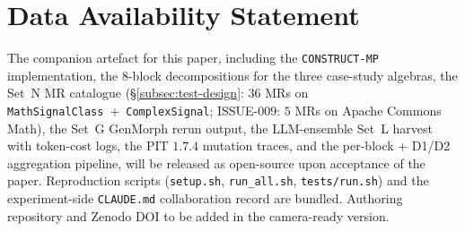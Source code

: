 \documentclass[acmsmall, screen]{acmart}
\begin{document}
\section*{Data Availability Statement}
The companion artefact for this paper, including the
\texttt{CONSTRUCT-MP} implementation, the 8-block decompositions for
the three case-study algebras, the Set~N MR catalogue
(\S\ref{subsec:test-design}: $36$ MRs on \texttt{MathSignalClass}~+~\texttt{ComplexSignal};
ISSUE-009: $5$ MRs on Apache Commons Math), the Set~G GenMorph rerun
output, the LLM-ensemble Set~L harvest with token-cost logs, the
PIT $1.7.4$ mutation traces, and the per-block + D1/D2 aggregation
pipeline, will be released as open-source upon acceptance of the
paper. Reproduction scripts (\texttt{setup.sh}, \texttt{run\_all.sh},
\texttt{tests/run.sh}) and the experiment-side \texttt{CLAUDE.md}
collaboration record are bundled. Authoring repository and Zenodo
DOI to be added in the camera-ready version.

\begin{acks}
\end{acks}



\end{document}
